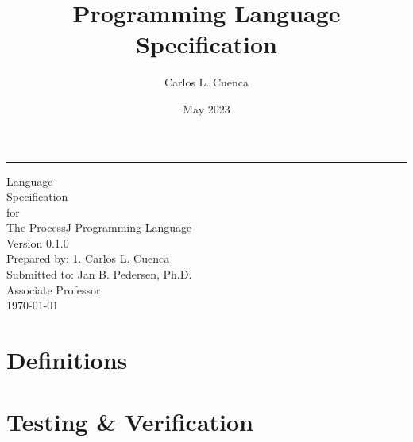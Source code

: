 \documentclass[12pt]{book}
\title{Programming Language Specification}
\author{Carlos L. Cuenca}
\date{May 2023}
\def\version{0.1.0}
\begin{document}

    \begin{flushright}
        \rule{12cm}{4pt}\vskip1cm
        \begin{bfseries}
            \Huge{Language\\ Specification}\\
            \vspace{0.8cm}
            for\\
            \vspace{0.8cm}
            The ProcessJ Programming Language\\
            \vspace{0.8cm}
            \LARGE{Version \version}\\
            \vspace{0.8cm}
            Prepared by: 1. Carlos L. Cuenca\\
            \vspace{0.8cm}
            Submitted to: Jan B. Pedersen, Ph.D. \\Associate Professor\\
            \vspace{0.8cm}
            \today\\
        \end{bfseries}
    \end{flushright}

    \tableofcontents


    \chapter{Definitions}


    \chapter{Testing \& Verification}
\end{document}
